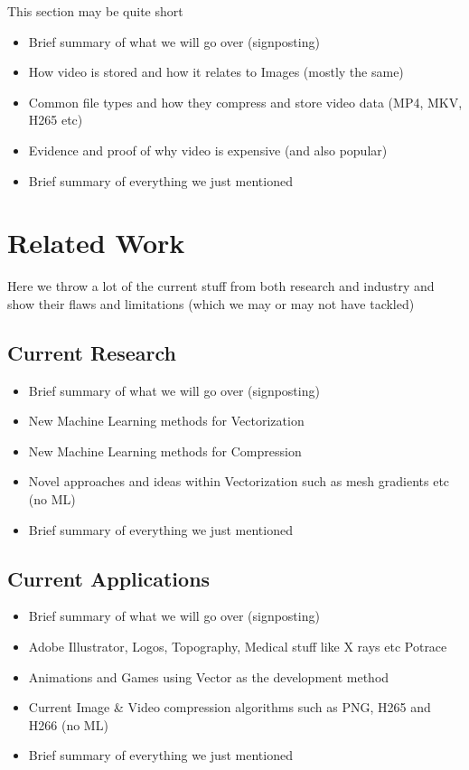 \documentclass[12pt]{article}
\begin{document}
    This section may be quite short

    \begin{itemize}
        \item Brief summary of what we will go over (signposting)
        \item How video is stored and how it relates to Images (mostly the same)
        \item Common file types and how they compress and store video data (MP4, MKV, H265 etc)
        \item Evidence and proof of why video is expensive (and also popular)
        \item Brief summary of everything we just mentioned
    \end{itemize}

    \pagebreak


    \section{Related Work}

    Here we throw a lot of the current stuff from both research and industry and show their flaws and limitations
    (which we may or may not have tackled)

    \subsection{Current Research}

    \begin{itemize}
        \item Brief summary of what we will go over (signposting)
        \item New Machine Learning methods for Vectorization
        \item New Machine Learning methods for Compression
        \item Novel approaches and ideas within Vectorization such as mesh gradients etc (no ML)
        \item Brief summary of everything we just mentioned
    \end{itemize}

    \subsection{Current Applications}

    \begin{itemize}
        \item Brief summary of what we will go over (signposting)
        \item Adobe Illustrator, Logos, Topography, Medical stuff like X rays etc Potrace
        \item Animations and Games using Vector as the development method
        \item Current Image \& Video compression algorithms such as PNG, H265 and H266 (no ML)
        \item Brief summary of everything we just mentioned
    \end{itemize}
\end{document}
